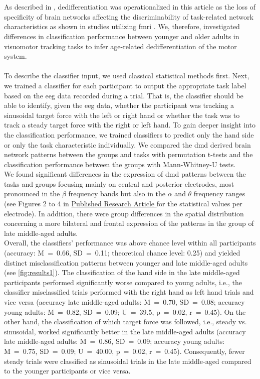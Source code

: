 \hyperref[pub:paperI]{}\\
\\
As described in , dedifferentiation was operationalized in this article as the loss of specificity of brain networks affecting the discriminability of task-related network characteristics as shown in studies utilizing \gls{fmri} \cite{Koen2019,Carb2011}. We, therefore, investigated differences in classification performance between younger and older adults in visuomotor tracking tasks to infer age-related dedifferentiation of the motor system.\\
\\
To describe the classifier input, we used classical statistical methods first. Next, we trained a classifier for each participant to output the appropriate task label based on the \gls{eeg} data recorded during a trial. That is, the classifier should be able to identify, given the \gls{eeg} data, whether the participant was tracking a sinusoidal target force with the left or right hand or whether the task was to track a steady target force with the right or left hand. To gain deeper insight into the classification performance, we trained classifiers to predict only the hand side or only the task characteristic individually. We compared the \gls{dmd} derived brain network patterns between the groups and tasks with permutation t-tests and the classification performance between the groups with Mann-Whitney-U tests.\\
\newpage
\noindent We found significant differences in the expression of \gls{dmd} patterns between the tasks and groups focusing mainly on central and posterior electrodes, most pronounced in the $\beta$ frequency bands but also in the $\alpha$ and $\theta$ frequency ranges (see Figures 2 to 4 in \hyperref[pub:paperI]{Published Research Article } for the statistical values per electrode). In addition, there were group differences in the spatial distribution concerning a more bilateral and frontal expression of the patterns in the group of late middle-aged adults.\\
Overall, the classifiers' performance was above chance level within all participants (accuracy: M~=~0.66, SD~=~0.11; theoretical chance level: 0.25) and yielded distinct misclassification patterns between younger and late middle-aged adults (see \autoref{fig:results1}). The classification of the hand side in the late middle-aged participants performed significantly worse compared to young adults, i.e., the classifier misclassified trials performed with the right hand as left hand trials and vice versa (accuracy late middle-aged adults: M~=~0.70, SD~=~0.08; accuracy young adults: M~=~0.82, SD~=~0.09; U~=~39.5, p~=~0.02, r~=~0.45). On the other hand, the classification of which target force was followed, i.e., steady vs. sinusoidal, worked significantly better in the late middle-aged adults (accuracy late middle-aged adults: M~=~0.86, SD~=~0.09; accuracy young adults: M~=~0.75, SD~=~0.09; U~=~40.00, p~=~0.02, r~=~0.45). Consequently, fewer steady trials were classified as sinusoidal trials in the late middle-aged compared to the younger participants or vice versa.

